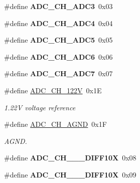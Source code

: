 \begin{CompactItemize}
\item 
\hypertarget{group__a2d_g0a668a769065eb671e703949ef772aa5}{
\#define \textbf{ADC\_\-CH\_\-ADC3}~0x03}
\label{group__a2d_g0a668a769065eb671e703949ef772aa5}

\item 
\hypertarget{group__a2d_g76e4beb0d4488c7a2854257ce6ee5efb}{
\#define \textbf{ADC\_\-CH\_\-ADC4}~0x04}
\label{group__a2d_g76e4beb0d4488c7a2854257ce6ee5efb}

\item 
\hypertarget{group__a2d_gf93d51a5c2da209e27f37ac2b26b1aa9}{
\#define \textbf{ADC\_\-CH\_\-ADC5}~0x05}
\label{group__a2d_gf93d51a5c2da209e27f37ac2b26b1aa9}

\item 
\hypertarget{group__a2d_gb260b92f5b040618c82c09154eb2fa82}{
\#define \textbf{ADC\_\-CH\_\-ADC6}~0x06}
\label{group__a2d_gb260b92f5b040618c82c09154eb2fa82}

\item 
\hypertarget{group__a2d_gb9748223968807824cc3d22300f21b8f}{
\#define \textbf{ADC\_\-CH\_\-ADC7}~0x07}
\label{group__a2d_gb9748223968807824cc3d22300f21b8f}

\item 
\hypertarget{group__a2d_g2cd1386de0c0435075581f5f14f50a4a}{
\#define \hyperlink{group__a2d_g2cd1386de0c0435075581f5f14f50a4a}{ADC\_\-CH\_\-122V}~0x1E}
\label{group__a2d_g2cd1386de0c0435075581f5f14f50a4a}

\begin{CompactList}\small\item\em 1.22V voltage reference \item\end{CompactList}\item 
\hypertarget{group__a2d_g0ed7f039502e8a1065f0b4a6157fb753}{
\#define \hyperlink{group__a2d_g0ed7f039502e8a1065f0b4a6157fb753}{ADC\_\-CH\_\-AGND}~0x1F}
\label{group__a2d_g0ed7f039502e8a1065f0b4a6157fb753}

\begin{CompactList}\small\item\em AGND. \item\end{CompactList}\item 
\hypertarget{group__a2d_g1d0b3b606a92ff5d5e328e5ef1979c78}{
\#define \textbf{ADC\_\-CH\_\_\_\-DIFF10X}~0x08}
\label{group__a2d_g1d0b3b606a92ff5d5e328e5ef1979c78}

\item 
\hypertarget{group__a2d_g8b2a5dcae180cd218d02f7a623790ef1}{
\#define \textbf{ADC\_\-CH\_\_\_\-DIFF10X}~0x09}
\label{group__a2d_g8b2a5dcae180cd218d02f7a623790ef1}


\end{CompactItemize}
